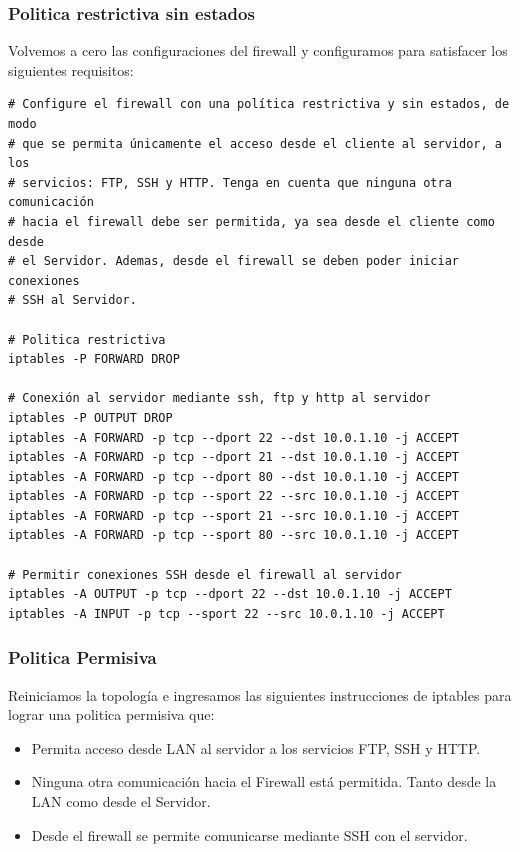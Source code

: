 
\subsubsection*{Politica restrictiva sin estados}

Volvemos a cero las configuraciones del firewall y configuramos para satisfacer los siguientes requisitos:

\begingroup
    \fontsize{9pt}{10pt}\selectfont
\begin{lstlisting}[breaklines=true]
# Configure el firewall con una política restrictiva y sin estados, de modo 
# que se permita únicamente el acceso desde el cliente al servidor, a los 
# servicios: FTP, SSH y HTTP. Tenga en cuenta que ninguna otra comunicación
# hacia el firewall debe ser permitida, ya sea desde el cliente como desde
# el Servidor. Ademas, desde el firewall se deben poder iniciar conexiones 
# SSH al Servidor.

# Politica restrictiva
iptables -P FORWARD DROP

# Conexión al servidor mediante ssh, ftp y http al servidor
iptables -P OUTPUT DROP
iptables -A FORWARD -p tcp --dport 22 --dst 10.0.1.10 -j ACCEPT
iptables -A FORWARD -p tcp --dport 21 --dst 10.0.1.10 -j ACCEPT
iptables -A FORWARD -p tcp --dport 80 --dst 10.0.1.10 -j ACCEPT
iptables -A FORWARD -p tcp --sport 22 --src 10.0.1.10 -j ACCEPT
iptables -A FORWARD -p tcp --sport 21 --src 10.0.1.10 -j ACCEPT
iptables -A FORWARD -p tcp --sport 80 --src 10.0.1.10 -j ACCEPT

# Permitir conexiones SSH desde el firewall al servidor
iptables -A OUTPUT -p tcp --dport 22 --dst 10.0.1.10 -j ACCEPT
iptables -A INPUT -p tcp --sport 22 --src 10.0.1.10 -j ACCEPT
\end{lstlisting}
\endgroup

\subsubsection*{Politica Permisiva}

Reiniciamos la topología e ingresamos las siguientes instrucciones de iptables para lograr una politica permisiva que:

\begin{itemize}
    \item Permita acceso desde LAN al servidor a los servicios FTP, SSH y HTTP.
    \item Ninguna otra comunicación hacia el Firewall está permitida. Tanto desde la LAN como desde el Servidor.
    \item Desde el firewall se permite comunicarse mediante SSH con el servidor.
\end{itemize}

